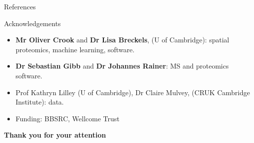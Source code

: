 \documentclass[presentation]{beamer}
\begin{document}
\begin{frame}[allowframebreaks]{References}
  \tiny
  
  
\end{frame}


\begin{frame}
  \begin{block}{Acknowledgements}
    \begin{itemize}
    \item \textbf{Mr Oliver Crook} and \textbf{Dr Lisa Breckels}, (U
      of Cambridge): spatial proteomics, machine learning, software.
    \item \textbf{Dr Sebastian Gibb} and \textbf{Dr Johannes Rainer}:
      MS and proteomics software.
    \item Prof Kathryn Lilley (U of Cambridge), Dr Claire Mulvey,
      (CRUK Cambridge Institute): data.
    \item Funding: BBSRC, Wellcome Trust
    \end{itemize}
  \end{block}

  
  \begin{center}
    \textbf{Thank you for your attention}
  \end{center}

\end{frame}
\end{document}
